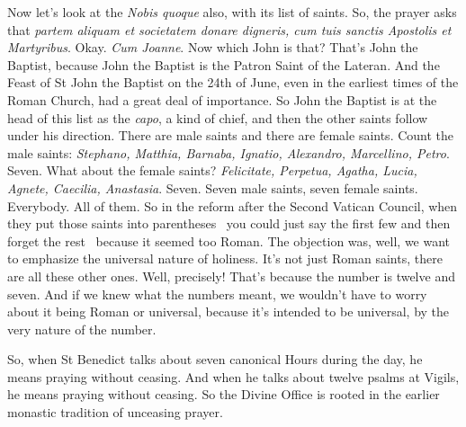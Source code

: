 Now let's look at the \emph{Nobis quoque} also, with its list of saints. So, the prayer asks that \emph{partem aliquam et societatem donare digneris, cum tuis sanctis Apostolis et Martyribus}. Okay. \emph{Cum Joanne}. Now which John is that? That's John the Baptist, because John the Baptist is the Patron Saint of the Lateran. And the Feast of St John the Baptist on the 24th of June, even in the earliest times of the Roman Church, had a great deal of importance. So John the Baptist is at the head of this list as the \emph{capo}, a kind of chief, and then the other saints follow under his direction. There are male saints and there are female saints. Count the male saints: \emph{Stephano, Matthia, Barnaba, Ignatio, Alexandro, Marcellino, Petro}. Seven. What about the female saints? \emph{Felicitate, Perpetua, Agatha, Lucia, Agnete, Caecilia, Anastasia}. Seven. Seven male saints, seven female saints. Everybody. All of them. So in the reform after the Second Vatican Council, when they put those saints into parentheses \textemdash\ you could just say the first few and then forget the rest \textemdash\ because it seemed too Roman. The objection was, well, we want to emphasize the universal nature of holiness. It's not just Roman saints, there are all these other ones. Well, precisely! That's because the number is twelve and seven. And if we knew what the numbers meant, we wouldn't have to worry about it being Roman or universal, because it's intended to be universal, by the very nature of the number.

So, when St Benedict talks about seven canonical Hours during the day, he means praying without ceasing. And when he talks about twelve psalms at Vigils, he means praying without ceasing. So the Divine Office is rooted in the earlier monastic tradition of unceasing prayer.

